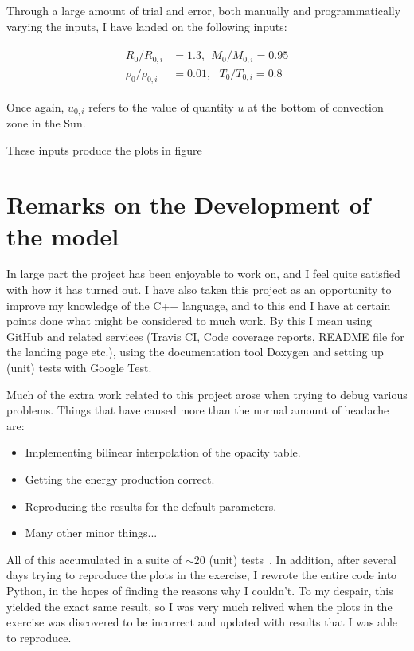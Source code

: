 \documentclass[11pt,twocolumn]{article}
\begin{document}
Through a large amount of trial and error, both manually and
programmatically varying the inputs, I have landed on the following
inputs:

\begin{align}
\begin{split}
  R_0/R_{0,i} &= 1.3, \ \ M_0/M_{0,i}= 0.95\\ 
  \rho_0/\rho_{0,i} &= 0.01,\ \ \    T_0/T_{0,i} = 0.8
\end{split}
\end{align}

Once again, $u_{0,i}$ refers to the value of quantity $u$ at the
bottom of convection zone in the Sun.

These inputs produce the plots in figure 




\section{Remarks on the Development of the model}
In large part the project has been enjoyable to work on, and I feel
quite satisfied with how it has turned out. I have also taken this
project as an opportunity to improve my knowledge of the C++ language,
and to this end I have at certain points done what might be considered
to much work. By this I mean using GitHub and related services
(Travis CI, Code coverage reports, README file for the landing page
etc.), using the documentation tool Doxygen and setting up
(unit) tests with Google Test. 

Much of the extra work related to this project arose when trying to
debug various problems. Things that have caused more than the normal
amount of headache are:

\begin{itemize}
  \item Implementing bilinear interpolation of the opacity table.
  \item Getting the energy production correct.
  \item Reproducing the results for the default parameters.
  \item Many other minor things...
\end{itemize}

All of this accumulated in a suite of $\sim 20$ (unit)
tests~\cite[tests/]{github}. In addition, after several days trying to
reproduce the plots in the exercise, I rewrote the entire code into
Python, in the hopes of finding the reasons why I couldn't. To my
despair, this yielded the exact same result, so I was very much
relived when the plots in the exercise was discovered to be incorrect and updated
with results that I was able to reproduce. 


\printbibliography
\end{document}
